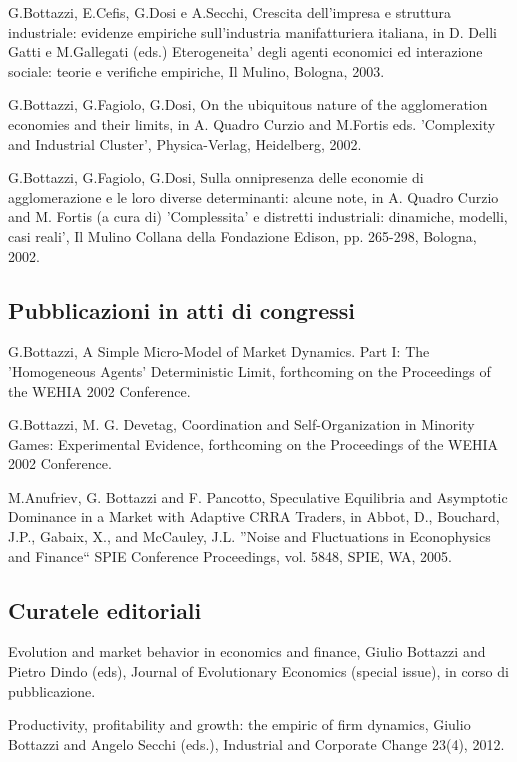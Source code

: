 \documentclass[a4paper]{article}
\begin{document}
G.Bottazzi, E.Cefis, G.Dosi e A.Secchi, Crescita dell'impresa e
struttura industriale: evidenze empiriche sull'industria
manifatturiera italiana, in D. Delli Gatti e M.Gallegati (eds.)
Eterogeneita' degli agenti economici ed interazione sociale: teorie e
verifiche empiriche, Il Mulino, Bologna, 2003.

G.Bottazzi, G.Fagiolo, G.Dosi, On the ubiquitous nature of the
agglomeration economies and their limits, in A. Quadro Curzio and
M.Fortis eds. 'Complexity and Industrial Cluster', Physica-Verlag,
Heidelberg, 2002.

G.Bottazzi, G.Fagiolo, G.Dosi, Sulla onnipresenza delle economie di
agglomerazione e le loro diverse determinanti: alcune note, in A.
Quadro Curzio and M. Fortis (a cura di) 'Complessita' e distretti
industriali: dinamiche, modelli, casi reali', Il Mulino Collana della
Fondazione Edison, pp. 265-298, Bologna, 2002.


\subsection{Pubblicazioni in atti di congressi%
  \label{pubblicazioni-in-atti-di-congressi}%
}

G.Bottazzi, A Simple Micro-Model of Market Dynamics. Part I: The
'Homogeneous Agents' Deterministic Limit, forthcoming on the
Proceedings of the WEHIA 2002 Conference.

G.Bottazzi, M. G. Devetag, Coordination and Self-Organization in
Minority Games: Experimental Evidence, forthcoming on the Proceedings
of the WEHIA 2002 Conference.

M.Anufriev, G. Bottazzi and F. Pancotto, Speculative Equilibria and
Asymptotic Dominance in a Market with Adaptive CRRA Traders, in Abbot,
D., Bouchard, J.P., Gabaix, X., and McCauley, J.L. ''Noise and
Fluctuations in Econophysics and Finance`` SPIE Conference Proceedings,
vol. 5848, SPIE, WA, 2005.


\subsection{Curatele editoriali%
  \label{curatele-editoriali}%
}

Evolution and market behavior in economics and finance, Giulio
Bottazzi and Pietro Dindo (eds), Journal of Evolutionary Economics
(special issue), in corso di pubblicazione.

Productivity, profitability and growth: the empiric of firm dynamics,
Giulio Bottazzi and Angelo Secchi (eds.), Industrial and Corporate
Change 23(4), 2012.
\end{document}
